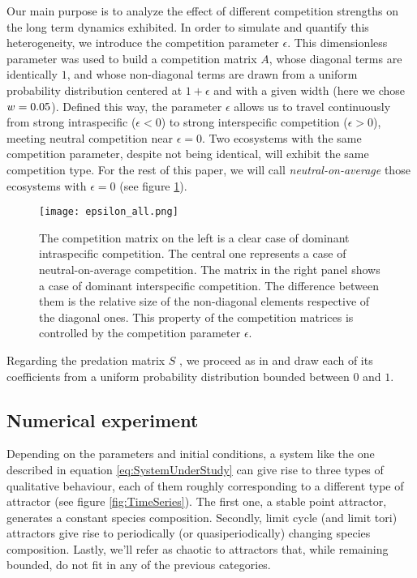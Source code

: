 Our main purpose is to analyze the effect of different competition strengths on the long term dynamics exhibited. In order to simulate and quantify this heterogeneity, we introduce the competition parameter $ \epsilon $. This dimensionless parameter was used to build a competition matrix $A$, whose diagonal terms are identically $ 1 $, and whose non-diagonal terms are drawn from a uniform probability distribution centered at $ 1 + \epsilon $ and with a given width (here we chose $ w = 0.05$). Defined this way, the parameter $\epsilon$ allows us to travel continuously from strong intraspecific ($ \epsilon < 0$) to strong interspecific competition ($ \epsilon > 0$), meeting neutral competition near $\epsilon = 0$. Two ecosystems with the same competition parameter, despite not being identical, will exhibit the same competition type. For the rest of this paper, we will call \textit{neutral-on-average} those ecosystems with $ \epsilon = 0$ (see figure \ref{fig:CompetitionParameter}).

\begin{figure}[H]
	\begin{center}
		\texttt{[image: epsilon\_all.png]}
	\end{center}
	\caption{The competition matrix on the left is a clear case of dominant intraspecific competition. The central one represents a case of neutral-on-average competition. The matrix in the right panel shows a case of dominant interspecific competition. The difference between them is the relative size of the non-diagonal elements respective of the diagonal ones. This property of the competition matrices is controlled by the competition parameter $\epsilon$.}
	\label{fig:CompetitionParameter}
\end{figure}

Regarding the predation matrix $S$ , we proceed as in \citet{Dakos2009b} and draw each of its coefficients from a uniform probability distribution bounded between $0$ and $1$.

\subsection{Numerical experiment}
\label{subsec:NumericalExperiment}

Depending on the parameters and initial conditions, a system like the one described in equation \eqref{eq:SystemUnderStudy} can give rise to three types of qualitative behaviour, each of them roughly corresponding to a different type of attractor (see figure \ref{fig:TimeSeries}). The first one, a stable point attractor, generates a constant species composition. Secondly, limit cycle (and limit tori) attractors give rise to periodically (or quasiperiodically) changing species composition. Lastly, we'll refer as chaotic to attractors that, while remaining bounded, do not fit in any of the previous categories.

